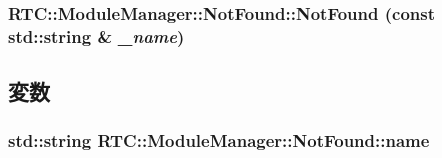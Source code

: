 \subsubsection[{NotFound}]{\setlength{\rightskip}{0pt plus 5cm}RTC::ModuleManager::NotFound::NotFound (const std::string \& {\em \_\-name})\hspace{0.3cm}{\ttfamily  [inline]}}\label{structRTC_1_1ModuleManager_1_1NotFound_a70e1590e2ecdedf83a59766290d47650}


\subsection{変数}
\subsubsection[{name}]{\setlength{\rightskip}{0pt plus 5cm}std::string {\bf RTC::ModuleManager::NotFound::name}}\label{structRTC_1_1ModuleManager_1_1NotFound_a6c1e71e3585e7fe3aa7a3f6905454944}

